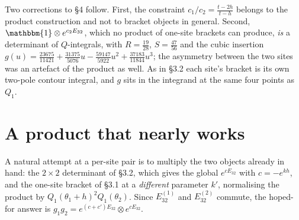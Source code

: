 \documentclass[11pt]{article}
\newcommand{\Ident}{\mathbbm{1}}
\begin{document}
Two corrections to \S4 follow. First, the constraint $c_1/c_2=\frac{t-2h}{t-h}$ belongs to the product
construction and not to bracket objects in general. Second, $\Ident\otimes e^{c_2E_{32}}$, which no
product of one-site brackets can produce, \emph{is} a determinant of $Q$-integrals, with
$R=\tfrac{19}{28}$, $S=\tfrac{47}{56}$ and the cubic insertion
$g(u)=\tfrac{23675}{11421}+\tfrac{31375}{5076}u-\tfrac{59147}{5922}u^2+\tfrac{37183}{11844}u^3$; the
asymmetry between the two sites was an artefact of the product as well. As in \S3.2 each site's
bracket is its own two-pole contour integral, and $g$ sits in the integrand at the same four points as
$Q_1$.

\section{A product that nearly works}

A natural attempt at a per-site pair is to multiply the two objects already in hand: the $2\times2$
determinant of \S3.2, which gives the global $e^{cE_{32}}$ with $c=-e^{kh}$, and the one-site bracket
of \S3.1 at a \emph{different} parameter $k'$, normalising the product by
$Q_1(\theta_1+h)^2Q_1(\theta_2)$. Since $E_{32}^{(1)}$ and $E_{32}^{(2)}$ commute, the hoped-for answer
is $g_1g_2=e^{(c+c')E_{32}}\otimes e^{cE_{32}}$.
\end{document}
